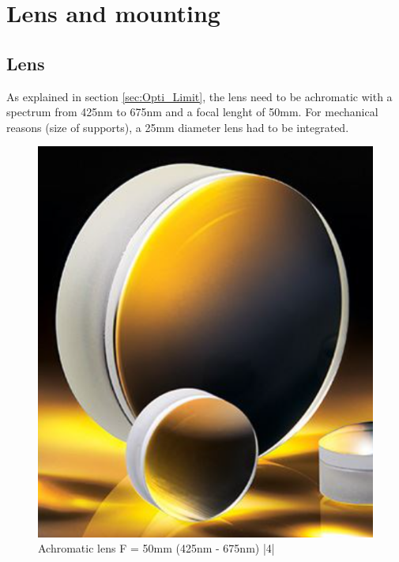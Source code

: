 \section{Lens and mounting}\label{sec:lens}
\subsection{Lens}
As explained in section \ref{sec:Opti_Limit}, the lens need to be achromatic with a spectrum from 425nm to 675nm 
and a focal lenght of 50mm. For mechanical reasons (size of supports), a 25mm diameter lens had to be integrated. 
\begin{figure}[H]
    \centering
    \includegraphics[scale=0.65]{assets/figures/Mechanical Design/Lentille.png}
    \caption{Achromatic lens F = 50mm (425nm - 675nm) |4|}
    \label{fig:Lentille}
\end{figure}
